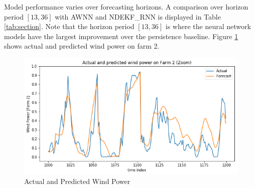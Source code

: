 \documentclass[conference]{IEEEtran}
\begin{document}
Model performance varies over forecasting horizons. %
A comparison over horizon period $[13, 36]$ with AWNN \cite{7894735} and NDEKF\_RNN \cite{Kanna13} is displayed in Table \ref{tab:section}. Note that the horizon period $[13,36]$ is where the neural network models have the largest improvement over the persistence baseline. Figure \ref{fig:actual} shows actual and predicted wind power on farm 2.


\begin{table}[ht]
\caption {Prediction error over horizon period $[13,36]$}
\begin{center}
\label{tab:section}
\end{center}
\vspace*{-1mm}
\end{table}

\begin{figure}[t]
\centering
\includegraphics[width=0.85\columnwidth]{FIG/actualzoom}
\caption{Actual and Predicted Wind Power}
\label{fig:actual}
\vspace*{-4mm}
\end{figure}
\end{document}
